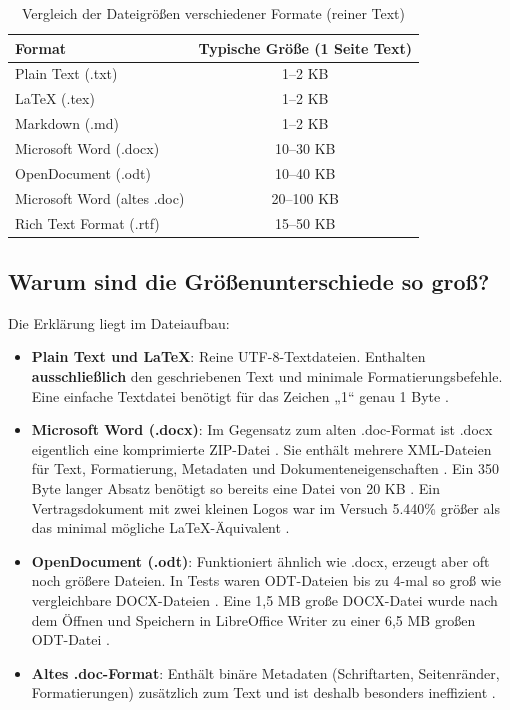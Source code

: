 \documentclass[a4paper,12pt]{article}
\begin{document}
	\begin{table}[h]
		\centering
		\caption{Vergleich der Dateigrößen verschiedener Formate (reiner Text)}
		\label{tab:dateigroessen}
		\begin{tabular}{l c}
			\toprule
			\textbf{Format} & \textbf{Typische Größe (1 Seite Text)} \\
			\midrule
			Plain Text (.txt) & 1–2 KB \\
			\LaTeX{} (.tex) & 1–2 KB \\
			Markdown (.md) & 1–2 KB \\
			Microsoft Word (.docx) & 10–30 KB \\
			OpenDocument (.odt) & 10–40 KB \\
			Microsoft Word (altes .doc) & 20–100 KB \\
			Rich Text Format (.rtf) & 15–50 KB \\
			\bottomrule
		\end{tabular}
	\end{table}
	
	\subsection{Warum sind die Größenunterschiede so groß?}
	
	Die Erklärung liegt im Dateiaufbau:
	
	\begin{itemize}
		\item \textbf{Plain Text und \LaTeX}: Reine UTF-8-Textdateien. Enthalten \textbf{ausschließlich} den geschriebenen Text und minimale Formatierungsbefehle. Eine einfache Textdatei benötigt für das Zeichen „1“ genau 1 Byte \cite{stackoverflow-file-size}.
		
		\item \textbf{Microsoft Word (.docx)}: Im Gegensatz zum alten .doc-Format ist .docx eigentlich eine komprimierte ZIP-Datei \cite{stackoverflow-zip}. Sie enthält mehrere XML-Dateien für Text, Formatierung, Metadaten und Dokumenteneigenschaften \cite{stackoverflow-xml}. Ein 350 Byte langer Absatz benötigt so bereits eine Datei von 20 KB \cite{physics-portable}. Ein Vertragsdokument mit zwei kleinen Logos war im Versuch 5.440\% größer als das minimal mögliche \LaTeX-Äquivalent \cite{wendl-document-size}.
		
		\item \textbf{OpenDocument (.odt)}: Funktioniert ähnlich wie .docx, erzeugt aber oft noch größere Dateien. In Tests waren ODT-Dateien bis zu 4-mal so groß wie vergleichbare DOCX-Dateien \cite{libreoffice-vergleich-2019}. Eine 1,5 MB große DOCX-Datei wurde nach dem Öffnen und Speichern in LibreOffice Writer zu einer 6,5 MB großen ODT-Datei \cite{libreoffice-vergleich-detail}.
		
		\item \textbf{Altes .doc-Format}: Enthält binäre Metadaten (Schriftarten, Seitenränder, Formatierungen) zusätzlich zum Text und ist deshalb besonders ineffizient \cite{stackoverflow-doc-vs-txt}.
	\end{itemize}
	
\end{document}
